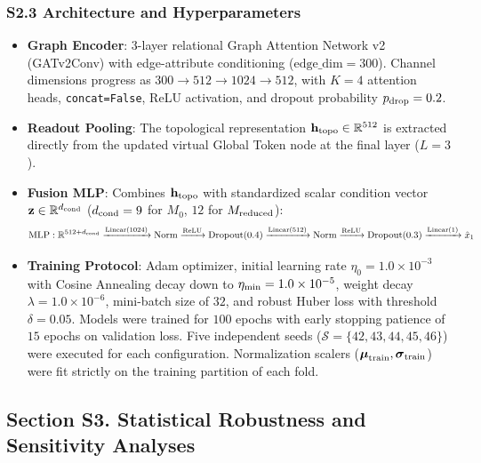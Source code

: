 \subsubsection*{S2.3 Architecture and Hyperparameters}
\begin{itemize}
    \item \textbf{Graph Encoder}: 3-layer relational Graph Attention Network v2 (GATv2Conv) with edge-attribute conditioning ($\text{edge\_dim} = 300$). Channel dimensions progress as $300 \to 512 \to 1024 \to 512$, with $K = 4$ attention heads, \texttt{concat=False}, ReLU activation, and dropout probability $p_{\rm drop} = 0.2$.
    \item \textbf{Readout Pooling}: The topological representation $\mathbf{h}_{\rm topo} \in \mathbb{R}^{512}$ is extracted directly from the updated virtual Global Token node at the final layer ($L=3$).
    \item \textbf{Fusion MLP}: Combines $\mathbf{h}_{\rm topo}$ with standardized scalar condition vector $\mathbf{z} \in \mathbb{R}^{d_{\rm cond}}$ ($d_{\rm cond} = 9$ for $M_0$, $12$ for $M_{\rm reduced}$):
    \begin{equation}
        \text{MLP}: \mathbb{R}^{512 + d_{\rm cond}} \xrightarrow{\text{Linear}(1024)} \text{Norm} \xrightarrow{\text{ReLU}} \text{Dropout}(0.4) \xrightarrow{\text{Linear}(512)} \text{Norm} \xrightarrow{\text{ReLU}} \text{Dropout}(0.3) \xrightarrow{\text{Linear}(1)} \hat{x}_1
    \end{equation}
    \item \textbf{Training Protocol}: Adam optimizer, initial learning rate $\eta_0 = 1.0 \times 10^{-3}$ with Cosine Annealing decay down to $\eta_{\rm min} = 1.0 \times 10^{-5}$, weight decay $\lambda = 1.0 \times 10^{-6}$, mini-batch size of $32$, and robust Huber loss with threshold $\delta = 0.05$. Models were trained for $100$ epochs with early stopping patience of $15$ epochs on validation loss. Five independent seeds ($\mathcal{S} = \{42, 43, 44, 45, 46\}$) were executed for each configuration. Normalization scalers ($\boldsymbol{\mu}_{\rm train}, \boldsymbol{\sigma}_{\rm train}$) were fit strictly on the training partition of each fold.
\end{itemize}

\subsection*{Section S3. Statistical Robustness and Sensitivity Analyses}

